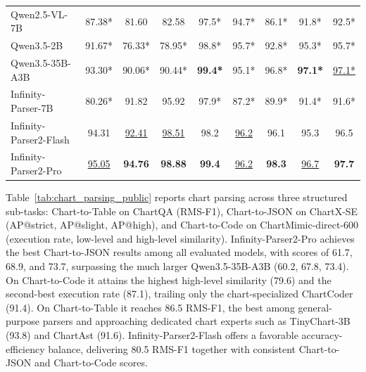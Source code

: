 \begin{table}[htbp]
\begin{tabular}{lcccccccc}
Qwen2.5-VL-7B & 87.38* & 81.60 & 82.58 & 97.5* & 94.7* & 86.1* & 91.8* & 92.5* \\
Qwen3.5-2B & 91.67* & 76.33* & 78.95* & 98.8* & 95.7* & 92.8* & 95.3* & 95.7* \\
Qwen3.5-35B-A3B & 93.30* & 90.06* & 90.44* & \textbf{99.4*} & 95.1* & 96.8* & \textbf{97.1*} & \underline{97.1*} \\
\midrule
Infinity-Parser-7B & 80.26* & 91.82 & 95.92 & 97.9* & 87.2* & 89.9* & 91.4* & 91.6* \\
Infinity-Parser2-Flash & 94.31 & \underline{92.41} & \underline{98.51} & 98.2 & \underline{96.2} & 96.1 & 95.3 & 96.5 \\
Infinity-Parser2-Pro & \underline{95.05} & \textbf{94.76} & \textbf{98.88} & \textbf{99.4} & \underline{96.2} & \textbf{98.3} & \underline{96.7} & \textbf{97.7} \\
\bottomrule
\end{tabular}
\end{table}

Table~\ref{tab:chart_parsing_public} reports chart parsing across three structured sub-tasks: Chart-to-Table on ChartQA (RMS-F1), Chart-to-JSON on ChartX-SE (AP@strict, AP@slight, AP@high), and Chart-to-Code on ChartMimic-direct-600 (execution rate, low-level and high-level similarity). Infinity-Parser2-Pro achieves the best Chart-to-JSON results among all evaluated models, with scores of 61.7, 68.9, and 73.7, surpassing the much larger Qwen3.5-35B-A3B (60.2, 67.8, 73.4). On Chart-to-Code it attains the highest high-level similarity (79.6) and the second-best execution rate (87.1), trailing only the chart-specialized ChartCoder (91.4). On Chart-to-Table it reaches 86.5 RMS-F1, the best among general-purpose parsers and approaching dedicated chart experts such as TinyChart-3B (93.8) and ChartAst (91.6). Infinity-Parser2-Flash offers a favorable accuracy-efficiency balance, delivering 80.5 RMS-F1 together with consistent Chart-to-JSON and Chart-to-Code scores.

